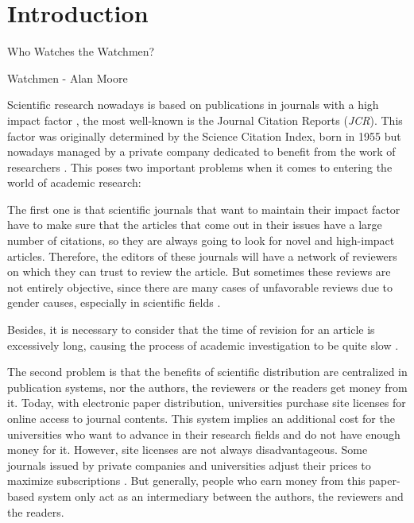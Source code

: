 \chapter{Introduction}
\label{intro}
\begin{FraseCelebre}
  \begin{Frase}
    Who Watches the Watchmen?
  \end{Frase}
  \begin{Fuente}
    Watchmen - Alan Moore
  \end{Fuente}
\end{FraseCelebre}

Scientific research nowadays is based on publications in journals with a high
impact factor \cite{doi:10.1001/jama.295.1.90}, the most well-known is the
Journal Citation Reports (\emph{JCR}). This factor was originally determined by
the Science Citation Index, born in 1955 \cite{garfield2007evolution} but
nowadays managed by a private company dedicated to benefit from the work
of researchers \cite{toledo2011book}. This poses two important problems when it
comes to entering the world of academic research:

The first one is that scientific journals that want to maintain their impact factor
have to make sure that the articles that come out in their issues have a large
number of citations, so they are always going to look for novel and high-impact
articles. Therefore, the editors of these journals will have a network of
reviewers on which they can trust to review the article. But sometimes these
reviews are not entirely objective, since there are many cases of unfavorable reviews
due to gender causes, especially in scientific fields
\cite{wenneras2001nepotism}.

Besides, it is necessary to consider that the time of revision for an article is
excessively long, causing the process of academic investigation to be quite slow
\cite{huisman2017duration}.

The second problem is that the benefits of scientific distribution are
centralized in publication systems, nor the authors, the reviewers or the
readers get money from it. Today, with electronic paper distribution,
universities purchase site licenses for online access to journal contents. This
system implies an additional cost for the universities who want to advance in
their research fields and do not have enough money for it. However, site
licenses are not always disadvantageous. Some journals issued by private
companies and universities adjust their prices to maximize subscriptions
\cite{bergstrom2004costs}. But generally, people who earn money from this
paper-based system only act as an intermediary between the authors, the
reviewers and the readers.

